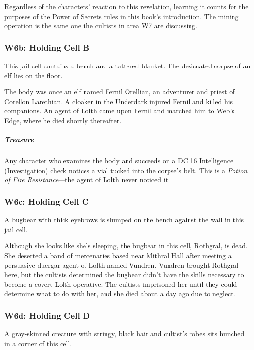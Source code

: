 \documentclass[10pt,a4paper,twoside,bg=print,twocolumn,openany,nodeprecatedcode]{dndbook}
\begin{document}
Regardless of the characters' reaction to this revelation, learning it counts for the purposes of the Power of Secrets rules in this book's introduction. The mining operation is the same one the cultists in area W7 are discussing.

\subsubsection{W6b: Holding Cell B}
\begin{DndReadAloud}{}
This jail cell contains a bench and a tattered blanket. The desiccated corpse of an elf lies on the floor.

\end{DndReadAloud}

The body was once an elf named Fernil Orellian, an adventurer and priest of Corellon Larethian. A cloaker in the Underdark injured Fernil and killed his companions. An agent of Lolth came upon Fernil and marched him to Web's Edge, where he died shortly thereafter.

\subparagraph{Treasure}
Any character who examines the body and succeeds on a DC 16 Intelligence (Investigation) check notices a vial tucked into the corpse's belt. This is a \textit{Potion of Fire Resistance}—the agent of Lolth never noticed it.

\subsubsection{W6c: Holding Cell C}
\begin{DndReadAloud}{}
A bugbear with thick eyebrows is slumped on the bench against the wall in this jail cell.

\end{DndReadAloud}

Although she looks like she's sleeping, the bugbear in this cell, Rothgral, is dead. She deserted a band of mercenaries based near Mithral Hall after meeting a persuasive duergar agent of Lolth named Vundren. Vundren brought Rothgral here, but the cultists determined the bugbear didn't have the skills necessary to become a covert Lolth operative. The cultists imprisoned her until they could determine what to do with her, and she died about a day ago due to neglect.

\subsubsection{W6d: Holding Cell D}
\begin{DndReadAloud}{}
A gray-skinned creature with stringy, black hair and cultist's robes sits hunched in a corner of this cell.

\end{DndReadAloud}
\end{document}

